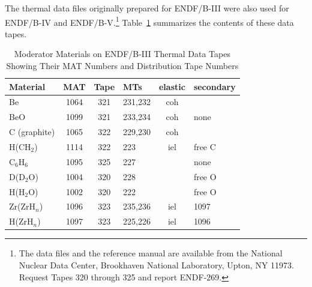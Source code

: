 The thermal data files originally prepared for
ENDF/B-III were also
used for ENDF/B-IV and ENDF/B-V.\footnote{The data files and the
reference manual\cite{GAreport} are available from the National
Nuclear Data Center, Brookhaven National Laboratory, Upton, NY 11973.
Request Tapes 320 through 325 and report ENDF-269.}  Table~\ref{th1}
summarizes the contents of these data tapes.

\begin{table}[t]
\caption[ENDF/B-III Thermal Data Files]{Moderator Materials on
ENDF/B-III Thermal Data Tapes Showing Their MAT Numbers and
Distribution Tape Numbers}
\label{th1}
\begin{center}
\begin{tabular}{lcclcl}
   Material         &  MAT  &  Tape  &  MTs   & elastic & secondary \\
  \hline
   Be               &  1064  &  321  &  231,232  &  coh  &           \\
   BeO              &  1099  &  321  &  233,234  &  coh  &  none     \\
   C (graphite)      &  1065  &  322  &  229,230  &  coh  &           \\
   H(CH$_2$)  &  1114  &  322  &  223      &  iel  &  free C   \\
   C$_6$H$_6$       &  1095  &  325  &  227      &       &  none     \\
   D(D$_2$O)        &  1004  &  320  &  228      &       &  free O   \\
   H(H$_2$O)        &  1002  &  320  &  222      &       &  free O   \\
   Zr(ZrH$_n$)      &  1096  &  323  &  235,236  &  iel  &  1097     \\
   H(ZrH$_n$)       &  1097  &  323  &  225,226  &  iel  &  1096     \\
  \hline
\end{tabular}
\end{center}
\end{table}

